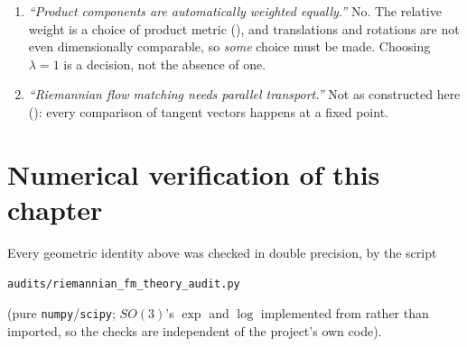 \documentclass[11pt,a4paper]{report}
\theoremstyle{definition}
\theoremstyle{remark}
\newcommand{\file}[1]{\texttt{#1}}
\begin{document}
\begin{enumerate}
\item \emph{``Product components are automatically weighted equally.''}
      No. The relative weight is a choice of product metric
      (), and translations and rotations are not
      even dimensionally comparable, so \emph{some} choice must be made.
      Choosing $\lambda=1$ is a decision, not the absence of one.

\item \emph{``Riemannian flow matching needs parallel transport.''}
      Not as constructed here (): every
      comparison of tangent vectors happens at a fixed point.
\end{enumerate}

\section{Numerical verification of this chapter}
\label{sec:rfm-numerics}

Every geometric identity above was checked in double precision, by the script
\begin{center}
\file{audits/riemannian\_fm\_theory\_audit.py}
\end{center}
(pure \texttt{numpy}/\texttt{scipy}; $SO(3)$'s $\exp$ and $\log$ implemented
from  rather than imported,
so the checks are independent of the project's own code).
\end{document}
